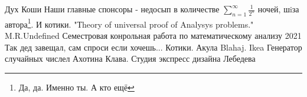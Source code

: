 \begin{thebibliography}{XXXX}
	 Дух Коши
	  Наши главные спонсоры - недосып в количестве $ \sum_{n=1}^{\infty} {\frac{1}{2^n}}$ ночей, шiза автора\footnote{Да, да. Именно ты. А кто ещё}. И котики.
	 "Тheory of universal proof of Analysys problems." M.R.Undefined
	 Семестровая конрольная работа по математическому анализу 2021
	 Так дед завещал, сам спроси если хочешь...
	 Котики. 
	 Акула Blahaj. Ikea
	 Генератор случайных числел
	 Ахотина Клава.
	 Студия экспресс дизайна Лебедева
\end{thebibliography}
